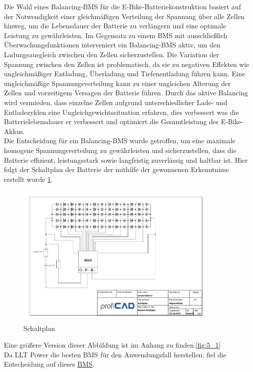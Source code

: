 
Die Wahl eines Balancing-BMS für die E-Bike-Batteriekonstruktion basiert auf der Notwendigkeit einer gleichmäßigen Verteilung der Spannung über alle Zellen hinweg, um die Lebensdauer der Batterie zu verlängern und eine optimale Leistung zu gewährleisten.
Im Gegensatz zu einem BMS mit ausschließlich Überwachungsfunktionen interveniert ein Balancing-BMS aktiv, um den Ladungsausgleich zwischen den Zellen sicherzustellen.
Die Variation der Spannung zwischen den Zellen ist problematisch, da sie zu negativen Effekten wie ungleichmäßiger Entladung, Überladung und Tiefenentladung führen kann.
Eine ungleichmäßige Spannungsverteilung kann zu einer ungleichen Alterung der Zellen und vorzeitigem Versagen der Batterie führen.
Durch das aktive Balancing wird vermieden, dass einzelne Zellen aufgrund unterschiedlicher Lade- und Entladezyklen eine Ungleichgewichtssituation erfahren,
dies verbessert was die Batterielebensdauer er verbessert und optimiert die Gesamtleistung des E-Bike-Akkus.\\

Die Entscheidung für ein Balancing-BMS wurde getroffen, um eine maximale homogene Spannungsverteilung zu gewährleisten und sicherzustellen, dass die Batterie effizient, leistungsstark sowie langfristig zuverlässig und haltbar ist.
Hier folgt der Schaltplan der Batterie der mithilfe der gewonnenen Erkenntnisse erstellt wurde \ref{fig:5}.

\begin{figure}[h]
    \centering
    \includegraphics[width=10cm]{images/Schaltplan.pdf}
    \caption{Schaltplan\cite{lorenz_scherrer_selbst_2023}}%
    \label{fig:5}
\end{figure}
Eine größere Version dieser Abbildung ist im Anhang zu finden.\ref{fig:5_1}\\
Da LLT Power die besten BMS für den Anwendungsfall herstellen, fiel die Entscheidung auf dieses \href{https://www.lithiumbatterypcb.com/product/10s-11s-12s-13s-14s-15s-36v-48v-60v-bms-with-bluetooth-and-pc-communication-120a-constant-current/}{BMS}.

